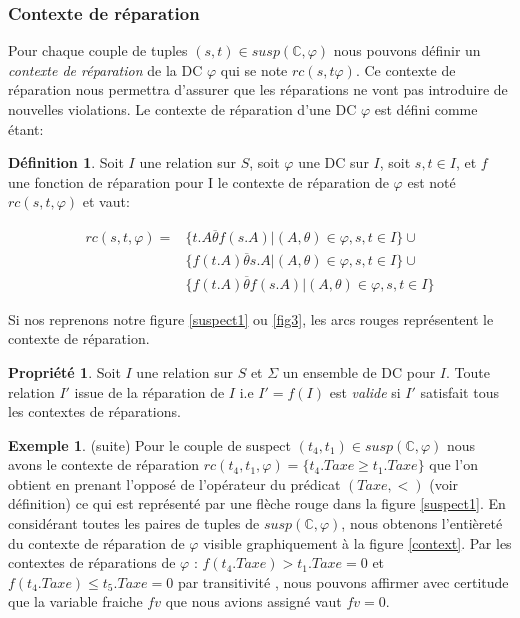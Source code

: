 \documentclass[letterpaper, 12pt]{report}
\theoremstyle{definition}
\newtheorem{mydef}{Définition}
\newtheorem{myprop}{Propriété}
\newtheorem{myexample}{Exemple}
\begin{document}
\subsubsection{Contexte de réparation}

Pour chaque couple de tuples $(s,t)\in susp(\mathbb{C},\varphi)$ nous pouvons définir un \emph{contexte de réparation} de la DC $\varphi$ qui se note $rc(s,t\varphi)$. Ce contexte de réparation nous permettra d'assurer que les réparations ne vont pas introduire de nouvelles violations. Le contexte de réparation d'une DC $\varphi$ est défini comme étant:

\begin{mydef}
Soit $I$ une relation sur $S$, soit $\varphi$ une DC sur $I$, soit $s,t \in I$, et $f$ une fonction de réparation pour I le contexte de réparation de $\varphi$ est noté $rc(s,t,\varphi)$ et vaut:

\begin{displaymath}
	\begin{split}
		rc(s,t,\varphi) = 
		&\{ t.A \overline{\theta} f(s.A) | (A,\theta) \in \varphi , s,t \in I \}\cup\\
		&\{ f(t.A) \overline{\theta} s.A | (A,\theta) \in \varphi , s,t \in I  \}\cup\\
		&\{ f(t.A) \overline{\theta} f(s.A) | (A,\theta) \in \varphi , s,t \in I  \}
	\end{split}
\end{displaymath}

\end{mydef}
Si nos reprenons notre figure \ref{suspect1}  ou \ref{fig3}, les arcs rouges représentent le contexte de réparation.
 
\begin{myprop}
 Soit $I$ une relation sur $S$ et $\Sigma$ un ensemble de DC pour $I$. Toute relation $I'$ issue de la réparation de $I$ i.e $I' = f(I)$ est \emph{valide} si $I'$ satisfait tous les contextes de réparations.
\end{myprop}

\begin{myexample} (suite)
Pour le couple de suspect $(t_4,t_1) \in susp(\mathbb{C},\varphi)$ nous avons le contexte de réparation $rc(t_4,t_1,\varphi) = \{ t_4.Taxe \geq t_1.Taxe \}$ que l'on obtient en prenant l'opposé de l'opérateur du prédicat $(Taxe, <)$ (voir définition) ce qui est représenté par une flèche rouge dans la figure \ref{suspect1}. En considérant toutes les paires de tuples de $susp(\mathbb{C},\varphi)$, nous obtenons l'entièreté du contexte de réparation de $\varphi$ visible graphiquement à la figure \ref{context}. Par les contextes de réparations de $\varphi$ : $f(t_4.Taxe) > t_1.Taxe = 0$ et $f(t_4.Taxe) \leq t_5.Taxe = 0$ par transitivité , nous pouvons affirmer avec certitude que la variable fraiche $fv$ que nous avions assigné vaut $fv = 0$.
\end{myexample}
\end{document}
